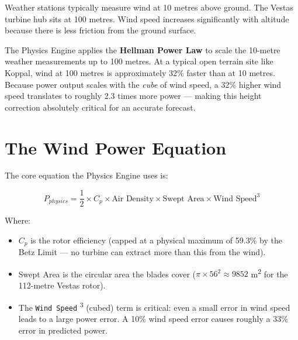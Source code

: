 \documentclass[12pt,a4paper]{report}
\begin{document}
Weather stations typically measure wind at 10 metres above ground. The Vestas turbine hub sits at 100 metres. Wind speed increases significantly with altitude because there is less friction from the ground surface.

The Physics Engine applies the \textbf{Hellman Power Law} to scale the 10-metre weather measurements up to 100 metres. At a typical open terrain site like Koppal, wind at 100 metres is approximately 32\% faster than at 10 metres. Because power output scales with the \textit{cube} of wind speed, a 32\% higher wind speed translates to roughly 2.3 times more power --- making this height correction absolutely critical for an accurate forecast.

\section{The Wind Power Equation}

The core equation the Physics Engine uses is:

\begin{equation}
    P_{physics} = \frac{1}{2} \times C_p \times \text{Air Density} \times \text{Swept Area} \times \text{Wind Speed}^3
\end{equation}

Where:
\begin{itemize}
    \item $C_p$ is the rotor efficiency (capped at a physical maximum of 59.3\% by the Betz Limit --- no turbine can extract more than this from the wind).
    \item Swept Area is the circular area the blades cover ($\pi \times 56^2 \approx 9852$ m\textsuperscript{2} for the 112-metre Vestas rotor).
    \item The \texttt{Wind Speed} \textsuperscript{3} (cubed) term is critical: even a small error in wind speed leads to a large power error. A 10\% wind speed error causes roughly a 33\% error in predicted power.
\end{itemize}
\end{document}
